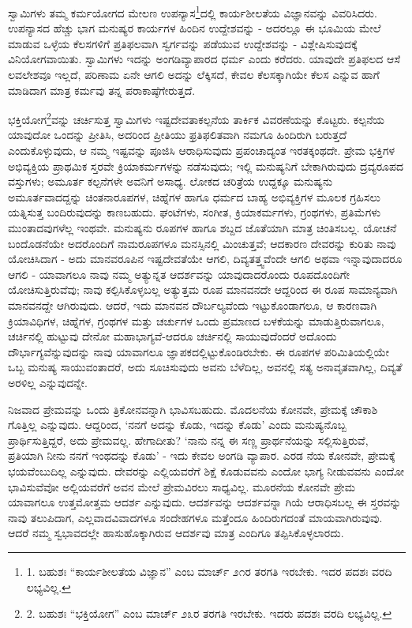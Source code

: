 ಸ್ವಾಮಿಗಳು ತಮ್ಮ ಕರ್ಮಯೋಗದ ಮೇಲಣ ಉಪನ್ಯಾಸ\footnote{1. ಬಹುಶಃ “ಕಾರ್ಯಶೀಲತೆಯ ವಿಜ್ಞಾನ” ಎಂಬ ಮಾರ್ಚ್ ೨೧ರ ತರಗತಿ ಇರಬೇಕು. ಇದರ ಪದಶಃ ವರದಿ ಲಭ್ಯವಿಲ್ಲ.}ದಲ್ಲಿ ಕಾರ್ಯಶೀಲತೆಯ ವಿಜ್ಞಾನವನ್ನು ವಿವರಿಸಿದರು. ಉಪನ್ಯಾಸದ ಹೆಚ್ಚು ಭಾಗ ಮನುಷ್ಯರ ಕಾರ್ಯಗಳ ಹಿಂದಿನ ಉದ್ದೇಶವನ್ನು - ಅದರಲ್ಲೂ ಈ ಭೂಮಿಯ ಮೇಲೆ ಮಾಡುವ ಒಳ್ಳೆಯ ಕೆಲಸಗಳಿಗೆ ಪ್ರತಿಫಲವಾಗಿ ಸ್ವರ್ಗವನ್ನು ಪಡೆಯುವ ಉದ್ದೇಶವನ್ನು - ವಿಶ್ಲೇಷಿಸುವುದಕ್ಕೆ ವಿನಿಯೋಗವಾಯಿತು. ಸ್ವಾಮಿಗಳು ಇದನ್ನು ಅಂಗಡಿವ್ಯಾಪಾರದ ಧರ್ಮ ಎಂದು ಕರೆದರು. ಯಾವುದೇ ಪ್ರತಿಫಲದ ಆಸೆ ಲವಲೇಶವೂ ಇಲ್ಲದೆ, ಪರಿಣಾಮ ಏನೇ ಆಗಲಿ ಅದನ್ನು ಲೆಕ್ಕಿಸದೆ, ಕೇವಲ ಕೆಲಸಕ್ಕಾಗಿಯೇ ಕೆಲಸ ಎನ್ನುವ ಹಾಗೆ ಮಾಡಿದಾಗ ಮಾತ್ರ ಕರ್ಮವು ತನ್ನ ಪರಾಕಾಷ್ಠೆಗೇರುತ್ತದೆ.

ಭಕ್ತಿಯೋಗ\footnote{2. ಬಹುಶಃ “ಭಕ್ತಿಯೋಗ” ಎಂಬ ಮಾರ್ಚ್ ೨೩ರ ತರಗತಿ ಇರಬೇಕು. ಇದರು ಪದಶಃ ವರದಿ ಲಭ್ಯವಿಲ್ಲ.}ವನ್ನು ಚರ್ಚಿಸುತ್ತ ಸ್ವಾಮಿಗಳು ಇಷ್ಟದೇವತಾಕಲ್ಪನೆಯ ತಾರ್ಕಿಕ ವಿವರಣೆಯನ್ನು ಕೊಟ್ಟರು. ಕಲ್ಪನೆಯ ಯಾವುದೋ ಒಂದನ್ನು ಪ್ರೀತಿಸಿ, ಅದರಿಂದ ಪ್ರೀತಿಯು ಫ್ರತಿಫಲಿತವಾಗಿ ನಮಗೂ ಹಿಂದಿರುಗಿ ಬರುತ್ತದೆ ಎಂದುಕೊಳ್ಳುವುದು, ಆ ನಮ್ಮ ಇಷ್ಟವನ್ನು ಪೂಜಿಸಿ ಆರಾಧಿಸುವುದು ಪ್ರಪಂಚಾದ್ಯಂತ ಇರತಕ್ಕಂಥದೇ. ಪ್ರೇಮ ಭಕ್ತಿಗಳ ಅಭಿವ್ಯಕ್ತಿಯ ಪ್ರಾಥಮಿಕ ಸ್ತರವೇ ಕ್ರಿಯಾಕರ್ಮಗಳನ್ನು ನಡೆಸುವುದು; ಇಲ್ಲಿ ಮನುಷ್ಯನಿಗೆ ಬೇಕಾಗಿರುವುದು ದ್ರವ್ಯರೂಪದ ವಸ್ತುಗಳು; ಅಮೂರ್ತ ಕಲ್ಪನೆಗಳೇ ಅವನಿಗೆ ಅಸಾಧ್ಯ. ಲೋಕದ ಚರಿತ್ರೆಯ ಉದ್ದಕ್ಕೂ ಮನುಷ್ಯನು ಅಮೂರ್ತವಾದದ್ದನ್ನು ಚಿಂತನಾರೂಪಗಳ, ಚಿಹ್ನೆಗಳ ಹಾಗೂ ಧರ್ಮದ ಬಾಹ್ಯ ಅಭಿವ್ಯಕ್ತಿಗಳ ಮೂಲಕ ಗ್ರಹಿಸಲು ಯತ್ನಿಸುತ್ತ ಬಂದಿರುವುದನ್ನು ಕಾಣಬಹುದು. ಘಂಟೆಗಳು, ಸಂಗೀತ, ಕ್ರಿಯಾಕರ್ಮಗಳು, ಗ್ರಂಥಗಳು, ಪ್ರತಿಮೆಗಳು ಮುಂತಾದವುಗಳೆಲ್ಲ ಇಂಥವೇ. ಮನುಷ್ಯನು ರೂಪಗಳ ಹಾಗೂ ಶಬ್ದದ ಜೊತೆಯಾಗಿ ಮಾತ್ರ ಚಿಂತಿಸಬಲ್ಲ. ಯೋಚನೆ ಬಂದೊಡನೆಯೇ ಅದರೊಂದಿಗೆ ನಾಮರೂಪಗಳೂ ಮನಸ್ಸಿನಲ್ಲಿ ಮಿಂಚುತ್ತವೆ; ಆದಕಾರಣ ದೇವರನ್ನು ಕುರಿತು ನಾವು ಯೋಚಿಸಿದಾಗ - ಅದು ಮಾನವರೂಪಿನ ಇಷ್ಟದೇವತೆಯೇ ಆಗಲಿ, ದಿವ್ಯತತ್ತ್ವವೆಂದೇ ಆಗಲಿ ಅಥವಾ ಇನ್ನಾವುದಾದರೂ ಆಗಲಿ - ಯಾವಾಗಲೂ ನಾವು ನಮ್ಮ ಅತ್ಯುನ್ನತ ಆದರ್ಶವನ್ನು ಯಾವುದಾದರೊಂದು ರೂಪದೊಂದಿಗೇ ಯೋಚಿಸುತ್ತಿರುವೆವು; ನಾವು ಕಲ್ಪಿಸಿಕೊಳ್ಳಬಲ್ಲ ಅತ್ಯುತ್ತಮ ರೂಪ ಮಾನವನದೇ ಆದ್ದರಿಂದ ಈ ರೂಪ ಸಾಮಾನ್ಯವಾಗಿ ಮಾನವನದ್ದೇ ಆಗಿರುವುದು. ಆದರೆ, ಇದು ಮಾನವನ ದೌರ್ಬಲ್ಯವೆಂದು ಇಟ್ಟುಕೊಂಡಾಗಲೂ, ಆ ಕಾರಣವಾಗಿ ಕ್ರಿಯಾವಿಧಿಗಳ, ಚಿಹ್ನೆಗಳ, ಗ್ರಂಥಗಳ ಮತ್ತು ಚರ್ಚುಗಳ ಒಂದು ಪ್ರಮಾಣದ ಬಳಕೆಯನ್ನು ಮಾಡುತ್ತಿರುವಾಗಲೂ, ಚರ್ಚಿನಲ್ಲಿ ಹುಟ್ಟುವು ದೇನೋ ಮಹಾಭಾಗ್ಯವೆ-ಆದರೂ ಚರ್ಚಿನಲ್ಲಿ ಸಾಯುವುದೆಂದರೆ ಅದೊಂದು ದೌರ್ಭಾಗ್ಯವೆನ್ನುವುದನ್ನು ನಾವು ಯಾವಾಗಲೂ ಜ್ಞಾಪಕದಲ್ಲಿಟ್ಟುಕೊಂಡಿರಬೇಕು. ಈ ರೂಪಗಳ ಪರಿಮಿತಿಯಲ್ಲಿಯೇ ಒಬ್ಬ ಮನುಷ್ಯ ಸಾಯುವಂತಾದರೆ, ಅದು ಸೂಚಿಸುವುದು ಅವನು ಬೆಳೆದಿಲ್ಲ, ಅವನಲ್ಲಿ ಸತ್ಯ ಅನಾವೃತವಾಗಿಲ್ಲ, ದಿವ್ಯತೆ ಅರಳಿಲ್ಲ ಎನ್ನುವುದನ್ನೇ.

ನಿಜವಾದ ಪ್ರೇಮವನ್ನು ಒಂದು ತ್ರಿಕೋನವನ್ನಾಗಿ ಭಾವಿಸಬಹುದು. ಮೊದಲನೆಯ ಕೋನವೇ, ಪ್ರೇಮಕ್ಕೆ ಚೌಕಾಶಿ ಗೊತ್ತಿಲ್ಲ ಎನ್ನುವುದು. ಆದ್ದರಿಂದ, ‘ನನಗೆ ಅದನ್ನು ಕೊಡು, ಇದನ್ನು ಕೊಡು’ ಎಂದು ಮನುಷ್ಯನೊಬ್ಬ ಪ್ರಾರ್ಥಿಸುತ್ತಿದ್ದರೆ, ಅದು ಪ್ರೇಮವಲ್ಲ. ಹೇಗಾದೀತು? ‘ನಾನು ನನ್ನ ಈ ಸಣ್ಣ ಪ್ರಾರ್ಥನೆಯನ್ನು ಸಲ್ಲಿಸುತ್ತಿರುವೆ, ಪ್ರತಿಯಾಗಿ ನೀನು ನನಗೆ ಇಂಥದನ್ನು ಕೊಡು’ - ಇದು ಕೇವಲ ಅಂಗಡಿ ವ್ಯಾಪಾರ. ಎರಡ ನೆಯ ಕೋನವೇ, ಪ್ರೇಮಕ್ಕೆ ಭಯವೆಂಬುದಿಲ್ಲ ಎನ್ನುವುದು. ದೇವರನ್ನು ಎಲ್ಲಿಯವರೆಗೆ ಶಿಕ್ಷೆ ಕೊಡುವವನು ಎಂದೋ ಭಾಗ್ಯ ನೀಡುವವನು ಎಂದೋ ಭಾವಿಸುವೆವೋ ಅಲ್ಲಿಯವರೆಗೆ ಅವನ ಮೇಲೆ ಪ್ರೇಮವಿರಲು ಸಾಧ್ಯವಿಲ್ಲ. ಮೂರನೆಯ ಕೋನವೇ ಪ್ರೇಮ ಯಾವಾಗಲೂ ಉತ್ತಮೋತ್ತಮ ಆದರ್ಶ ಎನ್ನುವುದು. ಆದರ್ಶವನ್ನು ಆದರ್ಶವನ್ನಾ ಗಿಯೆ ಆರಾಧಿಸಬಲ್ಲ ಈ ಸ್ತರವನ್ನು ನಾವು ತಲುಪಿದಾಗ, ಎಲ್ಲವಾದವಿವಾದಗಳೂ ಸಂದೇಹಗಳೂ ಮತ್ತೆಂದೂ ಹಿಂದಿರುಗದಂತೆ ಮಾಯವಾಗಿರುವುವು. ಆದರೆ ನಮ್ಮ ಸ್ವಭಾವದಲ್ಲೇ ಹಾಸುಹೊಕ್ಕಾಗಿರುವ ಆದರ್ಶವು ಮಾತ್ರ ಎಂದಿಗೂ ತಪ್ಪಿಸಿಕೊಳ್ಳಲಾರದು.

